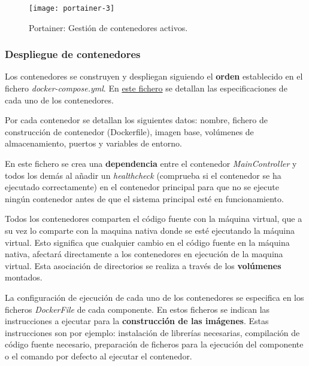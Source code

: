 \documentclass[../main.tex]{subfiles}
\begin{document}
\begin{figure}[H]
    \centering
    \texttt{[image: portainer-3]}
    \caption{Portainer: Gestión de contenedores activos.}
    \label{img:trello}
\end{figure}

\subsubsection{Despliegue de contenedores}\label{subsubsec:desp-contenedores}
Los contenedores se construyen y despliegan siguiendo el \textbf{orden} establecido en el fichero \textit{docker-compose.yml}. En \href{ch:anexo_docker}{este fichero} se detallan las especificaciones de cada uno de los contenedores.

Por cada contenedor se detallan los siguientes datos: nombre, fichero de construcción de contenedor (Dockerfile), imagen base, volúmenes de almacenamiento, puertos y variables de entorno.

En este fichero se crea una \textbf{dependencia} entre el contenedor \textit{MainController} y todos los demás al añadir un \textit{healthcheck} (comprueba si el contenedor se ha ejecutado correctamente) en el contenedor principal para que no se ejecute ningún contenedor antes de que el sistema principal esté en funcionamiento.

Todos los contenedores comparten el código fuente con la máquina virtual, que a su vez lo comparte con la maquina nativa donde se esté ejecutando la máquina virtual. Esto significa que cualquier cambio en el código fuente en la máquina nativa, afectará directamente a los contenedores en ejecución de la maquina virtual. Esta asociación de directorios se realiza a través de los \textbf{volúmenes} montados.

La configuración de ejecución de cada uno de los contenedores se especifica en los ficheros \textit{DockerFile} de cada componente. En estos ficheros se indican las instrucciones a ejecutar para la \textbf{construcción de las imágenes}. Estas instrucciones son por ejemplo: instalación de librerías necesarias, compilación de código fuente necesario, preparación de ficheros para la ejecución del componente o el comando por defecto al ejecutar el contenedor.
\end{document}
